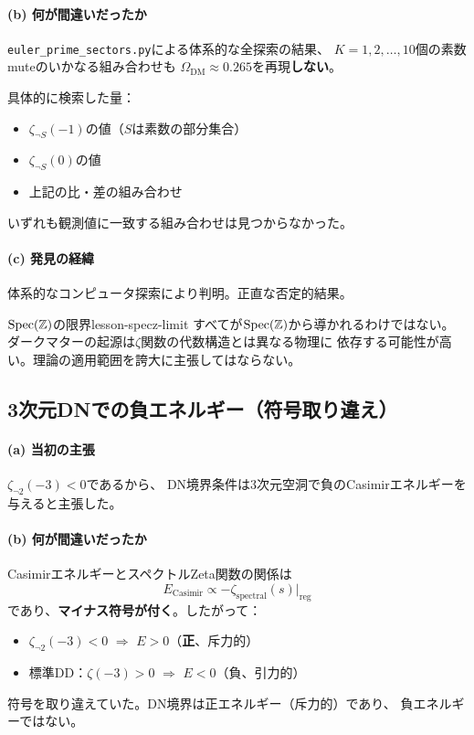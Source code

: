 \paragraph{(b) 何が間違いだったか}
\texttt{euler\_prime\_sectors.py}による体系的な全探索の結果、
$K = 1, 2, \ldots, 10$個の素数muteのいかなる組み合わせも
$\Omega_{\mathrm{DM}} \approx 0.265$を再現\textbf{しない}。

具体的に検索した量：
\begin{itemize}
\item $\zeta_{\neg S}(-1)$の値（$S$は素数の部分集合）
\item $\zeta_{\neg S}(0)$の値
\item 上記の比・差の組み合わせ
\end{itemize}
いずれも観測値に一致する組み合わせは見つからなかった。

\paragraph{(c) 発見の経緯}
体系的なコンピュータ探索により判明。正直な否定的結果。

\begin{keylesson}{$\operatorname{Spec}(\mathbb{Z})$の限界}{lesson-specz-limit}
すべてが$\operatorname{Spec}(\mathbb{Z})$から導かれるわけではない。
ダークマターの起源は$\zeta$関数の代数構造とは異なる物理に
依存する可能性が高い。理論の適用範囲を誇大に主張してはならない。
\end{keylesson}


\subsection{3次元DNでの負エネルギー（符号取り違え）}
\label{sec:15.7}

\paragraph{(a) 当初の主張}
$\zeta_{\neg 2}(-3) < 0$であるから、
DN境界条件は3次元空洞で負のCasimirエネルギーを与えると主張した。

\paragraph{(b) 何が間違いだったか}
CasimirエネルギーとスペクトルZeta関数の関係は
\[
E_{\text{Casimir}} \propto -\zeta_{\text{spectral}}(s)\big|_{\text{reg}}
\]
であり、\textbf{マイナス符号が付く}。したがって：
\begin{itemize}
\item $\zeta_{\neg 2}(-3) < 0$ $\Longrightarrow$ $E > 0$（\textbf{正}、斥力的）
\item 標準DD：$\zeta(-3) > 0$ $\Longrightarrow$ $E < 0$（負、引力的）
\end{itemize}
符号を取り違えていた。DN境界は正エネルギー（斥力的）であり、
負エネルギーではない。

